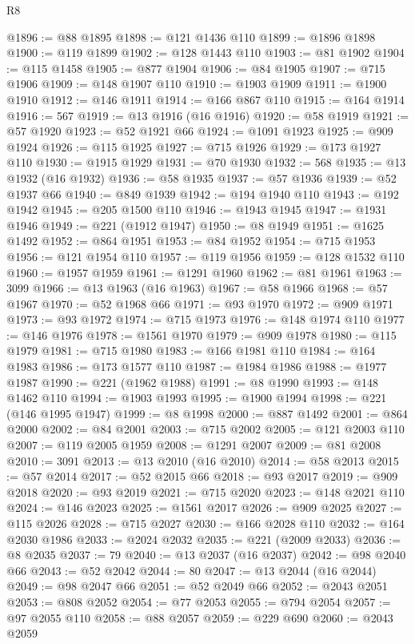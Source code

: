 \begin{lexlean}{R8}
\begin{coremodule}
@1896 := @88 @1895
@1898 := @121 @1436 @110
@1899 := @1896 @1898
@1900 := @119 @1899
@1902 := @128 @1443 @110
@1903 := @81 @1902
@1904 := @115 @1458
@1905 := @877 @1904
@1906 := @84 @1905
@1907 := @715 @1906
@1909 := @148 @1907 @110
@1910 := @1903 @1909
@1911 := @1900 @1910
@1912 := @146 @1911
@1914 := @166 @867 @110
@1915 := @164 @1914
@1916 := 567
@1919 := @13 @1916 (@16 @1916)
@1920 := @58 @1919
@1921 := @57 @1920
@1923 := @52 @1921 @66
@1924 := @1091 @1923
@1925 := @909 @1924
@1926 := @115 @1925
@1927 := @715 @1926
@1929 := @173 @1927 @110
@1930 := @1915 @1929
@1931 := @70 @1930
@1932 := 568
@1935 := @13 @1932 (@16 @1932)
@1936 := @58 @1935
@1937 := @57 @1936
@1939 := @52 @1937 @66
@1940 := @849 @1939
@1942 := @194 @1940 @110
@1943 := @192 @1942
@1945 := @205 @1500 @110
@1946 := @1943 @1945
@1947 := @1931 @1946
@1949 := @221 (@1912 @1947)
@1950 := @8 @1949
@1951 := @1625 @1492
@1952 := @864 @1951
@1953 := @84 @1952
@1954 := @715 @1953
@1956 := @121 @1954 @110
@1957 := @119 @1956
@1959 := @128 @1532 @110
@1960 := @1957 @1959
@1961 := @1291 @1960
@1962 := @81 @1961
@1963 := 3099
@1966 := @13 @1963 (@16 @1963)
@1967 := @58 @1966
@1968 := @57 @1967
@1970 := @52 @1968 @66
@1971 := @93 @1970
@1972 := @909 @1971
@1973 := @93 @1972
@1974 := @715 @1973
@1976 := @148 @1974 @110
@1977 := @146 @1976
@1978 := @1561 @1970
@1979 := @909 @1978
@1980 := @115 @1979
@1981 := @715 @1980
@1983 := @166 @1981 @110
@1984 := @164 @1983
@1986 := @173 @1577 @110
@1987 := @1984 @1986
@1988 := @1977 @1987
@1990 := @221 (@1962 @1988)
@1991 := @8 @1990
@1993 := @148 @1462 @110
@1994 := @1903 @1993
@1995 := @1900 @1994
@1998 := @221 (@146 @1995 @1947)
@1999 := @8 @1998
@2000 := @887 @1492
@2001 := @864 @2000
@2002 := @84 @2001
@2003 := @715 @2002
@2005 := @121 @2003 @110
@2007 := @119 @2005 @1959
@2008 := @1291 @2007
@2009 := @81 @2008
@2010 := 3091
@2013 := @13 @2010 (@16 @2010)
@2014 := @58 @2013
@2015 := @57 @2014
@2017 := @52 @2015 @66
@2018 := @93 @2017
@2019 := @909 @2018
@2020 := @93 @2019
@2021 := @715 @2020
@2023 := @148 @2021 @110
@2024 := @146 @2023
@2025 := @1561 @2017
@2026 := @909 @2025
@2027 := @115 @2026
@2028 := @715 @2027
@2030 := @166 @2028 @110
@2032 := @164 @2030 @1986
@2033 := @2024 @2032
@2035 := @221 (@2009 @2033)
@2036 := @8 @2035
@2037 := 79
@2040 := @13 @2037 (@16 @2037)
@2042 := @98 @2040 @66
@2043 := @52 @2042
@2044 := 80
@2047 := @13 @2044 (@16 @2044)
@2049 := @98 @2047 @66
@2051 := @52 @2049 @66
@2052 := @2043 @2051
@2053 := @808 @2052
@2054 := @77 @2053
@2055 := @794 @2054
@2057 := @97 @2055 @110
@2058 := @88 @2057
@2059 := @229 @690
@2060 := @2043 @2059

\end{coremodule}
\end{lexlean}

